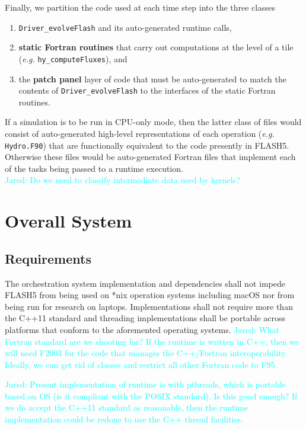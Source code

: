 \documentclass{article}
\newcommand{\Jared}[1]          {\textcolor{cyan}{Jared: #1}}
\begin{document}
Finally, we partition the code used at each time step into the three classes
\begin{enumerate}
\item{\texttt{Driver\_evolveFlash} and its auto-generated runtime calls,}
\item{\textbf{static Fortran routines} that carry out computations at the
level of a tile (\textit{e.g.} \texttt{hy\_computeFluxes}), and}
\item{the \textbf{patch panel} layer of code that must be auto-generated to
match the contents of \texttt{Driver\_evolveFlash} to the interfaces of the
static Fortran routines.}
\end{enumerate}
If a simulation is to be run in CPU-only mode, then the latter class of files
would consist of auto-generated high-level representations of each operation
(\textit{e.g.} \texttt{Hydro.F90}) that are functionally equivalent to the code presently
in FLASH5.  Otherwise these files would be auto-generated Fortran files that
implement each of the tasks being passed to a runtime execution.\\

\Jared{Do we need to classify intermediate data used by kernels?}

\section{Overall System}
\subsection{Requirements}

\begin{req}
The orchestration system implementation and dependencies shall not impede FLASH5
from being used on *nix operation systems including macOS nor from being run for
research on laptops.  Implementations shall not require more than the C++11
standard and threading implementations shall be portable across platforms that
conform to the aforemented operating systems.  \Jared{What
Fortran standard are we shooting for?  If the runtime is written in C++, then we
will need F2003 for the code that manages the C++/Fortran interoperability.
Ideally, we can get rid of classes and restrict all other Fortran code to F95.}
\end{req}

\Jared{Present implementation of runtime is with pthreads, which is
portable based on OS (is it compliant with the POSIX standard).  Is this good
enough?  If we do accept the C++11 standard as reasonable, then the runtime
implementation could be redone to use the C++ thread facilities.}\\
\end{document}
